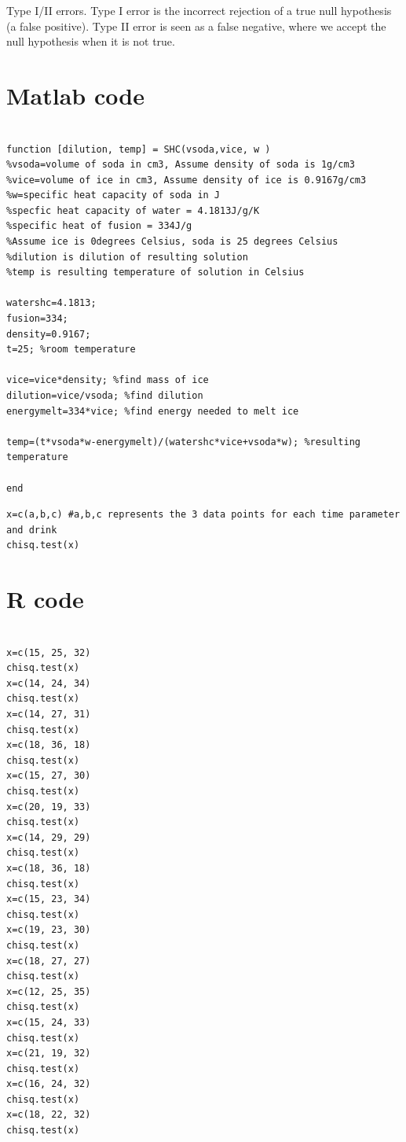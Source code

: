 \documentclass[oneside,12pt]{report}
\begin{document}
\noindent Type I/II errors. 
\indent Type I error is the incorrect rejection of a true null hypothesis (a false positive). Type II error is seen as a false negative, where we accept the null hypothesis when it is not true.


\chapter{Matlab code}\label{Matlab and R code}
\begin{lstlisting}[caption= Matlab code for calculating resulting temperature and dilution, label = matlab]

function [dilution, temp] = SHC(vsoda,vice, w )
%vsoda=volume of soda in cm3, Assume density of soda is 1g/cm3
%vice=volume of ice in cm3, Assume density of ice is 0.9167g/cm3
%w=specific heat capacity of soda in J
%specfic heat capacity of water = 4.1813J/g/K
%specific heat of fusion = 334J/g
%Assume ice is 0degrees Celsius, soda is 25 degrees Celsius
%dilution is dilution of resulting solution
%temp is resulting temperature of solution in Celsius

watershc=4.1813;
fusion=334;
density=0.9167;
t=25; %room temperature

vice=vice*density; %find mass of ice
dilution=vice/vsoda; %find dilution
energymelt=334*vice; %find energy needed to melt ice

temp=(t*vsoda*w-energymelt)/(watershc*vice+vsoda*w); %resulting temperature

end
\end{lstlisting}
\vspace{5pt}
\begin{lstlisting}[caption= R code for chi-squared test, label=chisq]
x=c(a,b,c) #a,b,c represents the 3 data points for each time parameter and drink
chisq.test(x)
\end{lstlisting}


\chapter{R code}\label{R}
\begin{lstlisting}[caption= R code for implementing Pearson's chi-squared test, label = Rcode]

x=c(15, 25, 32)
chisq.test(x)
x=c(14, 24, 34)
chisq.test(x)
x=c(14, 27, 31)
chisq.test(x)
x=c(18, 36, 18)
chisq.test(x)
x=c(15, 27, 30)
chisq.test(x)
x=c(20, 19, 33)
chisq.test(x)
x=c(14, 29, 29)
chisq.test(x)
x=c(18, 36, 18)
chisq.test(x)
x=c(15, 23, 34)
chisq.test(x)
x=c(19, 23, 30)
chisq.test(x)
x=c(18, 27, 27)
chisq.test(x)
x=c(12, 25, 35)
chisq.test(x)
x=c(15, 24, 33)
chisq.test(x)
x=c(21, 19, 32)
chisq.test(x)
x=c(16, 24, 32)
chisq.test(x)
x=c(18, 22, 32)
chisq.test(x)
\end{lstlisting}
\vspace{5pt}
\end{document}
